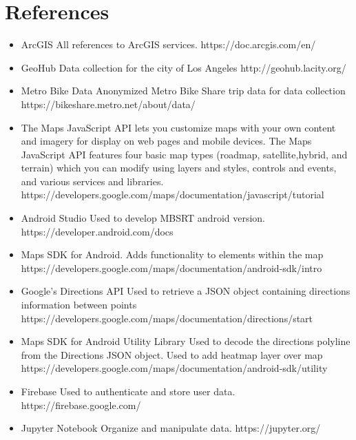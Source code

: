 \documentclass[a4paper,12pt]{article}
\begin{document}
\section{References}
\begin{itemize}
    \item ArcGIS All references to ArcGIS services. https://doc.arcgis.com/en/
    \item GeoHub Data collection for the city of Los Angeles http://geohub.lacity.org/
    \item Metro Bike Data Anonymized Metro Bike Share trip data for data collection https://bikeshare.metro.net/about/data/
    \item The Maps JavaScript API lets you customize maps with your own content and imagery for display on web pages and mobile devices. The Maps JavaScript API features four basic map types (roadmap, satellite,hybrid, and terrain) which you can modify using layers and styles, controls and events, and various services and libraries. https://developers.google.com/maps/documentation/javascript/tutorial
    \item Android Studio Used to develop MBSRT android version. https://developer.android.com/docs
    \item Maps SDK for Android. Adds functionality to elements within the map https://developers.google.com/maps/documentation/android-sdk/intro
    \item Google’s Directions API Used to retrieve a JSON object containing directions information between points https://developers.google.com/maps/documentation/directions/start
    \item Maps SDK for Android Utility Library Used to decode the directions polyline from the Directions JSON object. Used to add heatmap layer over map https://developers.google.com/maps/documentation/android-sdk/utility
    \item Firebase Used to authenticate and store user data. https://firebase.google.com/
    \item Jupyter Notebook Organize and manipulate data. https://jupyter.org/
\end{itemize}
\end{document}
